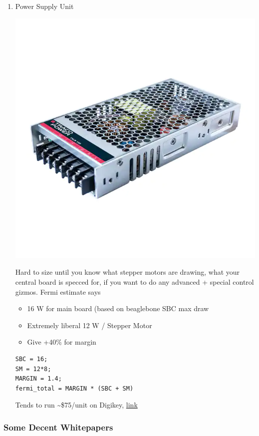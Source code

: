 \documentclass[11pt]{article}
\begin{document}
\begin{enumerate}
\item Power Supply Unit
\label{sec:org0b31321}
\begin{center}
\includegraphics[width=.9\linewidth]{Power_Supply_Unit/2022-07-18_14-27-16_screenshot.png}
\end{center}
Hard to size until you know what stepper motors are drawing, what your central board is specced for, if you want to do any advanced + special control gizmos. Fermi estimate says
\begin{itemize}
\item 16 W for main board (based on beaglebone SBC max draw
\item Extremely liberal 12 W / Stepper Motor
\item Give +40\% for margin
\end{itemize}
\begin{verbatim}
SBC = 16;
SM = 12*8;
MARGIN = 1.4;
fermi_total = MARGIN * (SBC + SM)
\end{verbatim}
Tends to run \textasciitilde{}\$75/unit on Digikey, \href{https://www.digikey.com/en/products/detail/traco-power/TXLN-150-124/13681763}{link}
\end{enumerate}

\subsubsection{Some Decent Whitepapers}
\label{sec:orgc274b9f}
\end{document}
